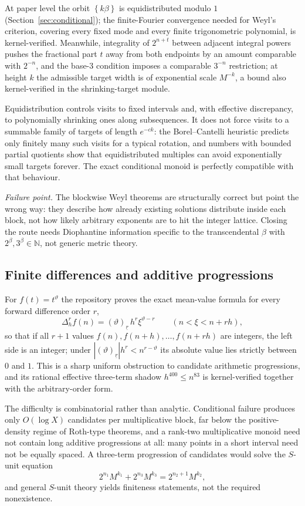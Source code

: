 \documentclass[11pt,oneside]{article}
\theoremstyle{definition}
\theoremstyle{remark}
\newcommand{\N}{\mathbb N}
\newcommand{\thetaq}{\vartheta}
\newcommand{\fract}[1]{\left\{#1\right\}}
\newcommand{\fall}[2]{\left(#1\right)_{\!\underline{#2}}}
\begin{document}
At paper level the orbit $\fract{k\beta}$ is equidistributed modulo $1$
(Section~\ref{sec:conditional}); the finite-Fourier convergence needed for Weyl's criterion,
covering every fixed mode and every finite trigonometric polynomial, is kernel-verified.
Meanwhile, integrality of $2^{n+t}$ between adjacent integral powers pushes the fractional
part $t$ away from both endpoints by an amount comparable with $2^{-n}$, and the base-$3$
condition imposes a comparable $3^{-n}$ restriction; at height $k$ the admissible target
width is of exponential scale $M^{-k}$, a bound also kernel-verified in the
shrinking-target module.

Equidistribution controls visits to fixed intervals and, with effective discrepancy, to
polynomially shrinking ones along subsequences.  It does not force visits to a summable
family of targets of length $e^{-ck}$: the Borel--Cantelli heuristic predicts only finitely
many such visits for a typical rotation, and numbers with bounded partial quotients show
that equidistributed multiples can avoid exponentially small targets forever.  The exact
conditional monoid is perfectly compatible with that behaviour.

\emph{Failure point.}  The blockwise Weyl theorems are structurally correct but point the
wrong way: they describe how already existing solutions distribute inside each block, not
how likely arbitrary exponents are to hit the integer lattice.  Closing the route needs
Diophantine information specific to the transcendental $\beta$ with $2^{\beta},3^{\beta}\in\N$,
not generic metric theory.

\subsection{Finite differences and additive progressions}
\label{at:diff}

For $f(t)=t^{\thetaq}$ the repository proves the exact mean-value formula for every forward
difference order $r$,
\[
  \Delta_h^{r}f(n)=\fall{\thetaq}{r}\,h^{r}\xi^{\thetaq-r}
  \qquad(n<\xi<n+rh),
\]
so that if all $r+1$ values $f(n),f(n+h),\dots,f(n+rh)$ are integers, the left side is an
integer; under $|\fall{\thetaq}{r}|h^{r}<n^{r-\thetaq}$ its absolute value lies strictly
between $0$ and $1$.  This is a sharp uniform obstruction to candidate arithmetic
progressions, and its rational effective three-term shadow $h^{400}\le n^{83}$ is
kernel-verified together with the arbitrary-order form.

The difficulty is combinatorial rather than analytic.  Conditional failure produces only
$O(\log X)$ candidates per multiplicative block, far below the positive-density regime of
Roth-type theorems, and a rank-two multiplicative monoid need not contain long additive
progressions at all: many points in a short interval need not be equally spaced.  A
three-term progression of candidates would solve the $S$-unit equation
\[
  2^{n_1}M^{k_1}+2^{n_3}M^{k_3}=2^{n_2+1}M^{k_2},
\]
and general $S$-unit theory yields finiteness statements, not the required nonexistence.
\end{document}
